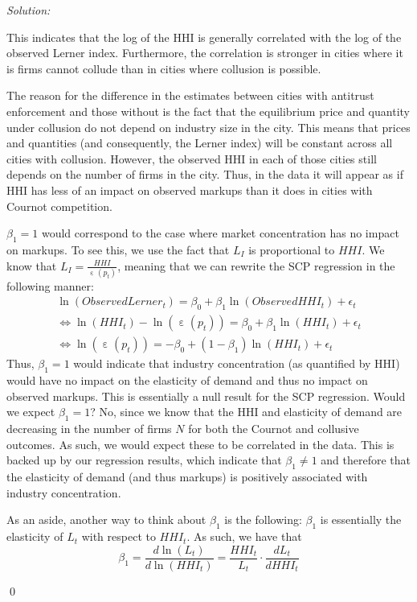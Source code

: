 \documentclass[12pt]{article}
\DeclareMathOperator{\eps}{\varepsilon}
\newenvironment{sol}
    {\emph{Solution:}
    }
    {
    \qed
    }
\begin{document}
\begin{sol}
      This indicates that the log of the HHI is generally correlated with the log of the observed Lerner index. Furthermore, the correlation is stronger in cities where it is firms cannot collude than in cities where collusion is possible. 

      The reason for the difference in the estimates between cities with antitrust enforcement and those without is the fact that the equilibrium price and quantity under collusion do not depend on industry size in the city. This means that prices and quantities (and consequently, the Lerner index) will be constant across all cities with collusion. However, the observed HHI in each of those cities still depends on the number of firms in the city. Thus, in the data it will appear as if HHI has less of an impact on observed markups than it does in cities with Cournot competition.

      $\beta_1 = 1$ would correspond to the case where market concentration has no impact on markups. To see this, we use the fact that $L_I$ is proportional to $HHI$. We know that $L_I = \frac{HHI}{\eps(p_t)}$, meaning that we can rewrite the SCP regression in the following manner:
      \begin{align*}
         \ln(ObservedLerner_t) = \beta_0 + \beta_1 \ln(ObservedHHI_t) + \epsilon_t\\
         \iff \ln(HHI_t) - \ln(\eps(p_t)) = \beta_0 + \beta_1 \ln(HHI_t) + \epsilon_t\\
         \iff \ln(\eps(p_t)) = -\beta_0 + (1-\beta_1 )\ln(HHI_t) + \epsilon_t
      \end{align*}
      Thus, $\beta_1 = 1$ would indicate that industry concentration (as quantified by HHI) would have no impact on the elasticity of demand and thus no impact on observed markups. This is essentially a null result for the SCP regression. Would we expect $\beta_1 = 1$? No, since we know that the HHI and elasticity of demand are decreasing in the number of firms $N$ for both the Cournot and collusive outcomes. As such, we would expect these to be correlated in the data. This is backed up by our regression results, which indicate that $\beta_1 \neq 1$ and therefore that the elasticity of demand (and thus markups) is positively associated with industry concentration. 

      As an aside, another way to think about $\beta_1$ is the following: $\beta_1$ is essentially the elasticity of $L_t$ with respect to $HHI_t$. As such, we have that 
      \[\beta_1 = \frac{d \ln(L_t)}{d \ln(HHI_t)} = \frac{HHI_t}{L_t} \cdot \frac{d L_t}{d HHI_t}\]
\end{sol}
\end{document}
